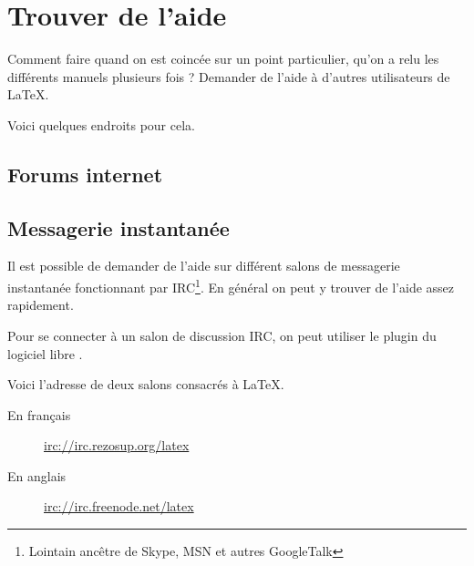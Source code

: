 \chapter{Trouver de l'aide}

\begin{prealable}
Comment faire quand on est coincée sur un point particulier, qu'on a relu les différents manuels plusieurs fois ? Demander de l'aide à d'autres utilisateurs de \LaTeX.

Voici quelques endroits pour cela.
\end{prealable}

\section{Forums internet}

\section{Messagerie instantanée}

Il est possible de demander de l'aide sur différent salons de messagerie instantanée fonctionnant par IRC\footnote{Lointain ancêtre de Skype, MSN et autres GoogleTalk}. En général on peut y trouver de l'aide assez rapidement.

Pour se connecter à un salon de discussion IRC, on peut utiliser le plugin  du logiciel libre .

Voici l'adresse de deux salons consacrés à \LaTeX.

\begin{description}
\item[En français]\url{irc://irc.rezosup.org/latex}
\item[En anglais]\url{irc://irc.freenode.net/latex}
\end{description}